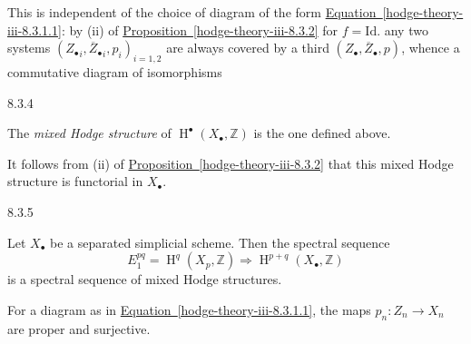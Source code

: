     This is independent of the choice of diagram of the form \hyperref[hodge-theory-iii-8.3.1.1]{Equation~\ref*{hodge-theory-iii-8.3.1.1}}: by (ii) of \hyperref[hodge-theory-iii-8.3.2]{Proposition~\ref*{hodge-theory-iii-8.3.2}} for \(f=\mathrm {Id}\). any two systems \(({Z_\bullet }_i,{\overline {Z}_\bullet }_i,p_i)_{i=1,2}\) are always covered by a third \((Z_\bullet ,\overline {Z}_\bullet ,p)\), whence a commutative diagram of isomorphisms

    
  \begin{definition}{8.3.4}\label{hodge-theory-iii-8.3.4}\skipsinglepar\par{}The \emph{mixed Hodge structure} of \(\operatorname {H}^\bullet (X_\bullet ,\mathbb {Z})\) is the one defined above.\end{definition}\par{}It follows from (ii) of \hyperref[hodge-theory-iii-8.3.2]{Proposition~\ref*{hodge-theory-iii-8.3.2}} that this mixed Hodge structure is functorial in \(X_\bullet \).\begin{proposition}{8.3.5}\label{hodge-theory-iii-8.3.5}\skipsinglepar\par{}Let \(X_\bullet \) be a separated simplicial scheme.
    Then the spectral sequence
    \[       E_1^{pq}       = \operatorname {H}^q(X_p,\mathbb {Z})       \Rightarrow  \operatorname {H}^{p+q}(X_\bullet ,\mathbb {Z})     \]
    is a spectral sequence of mixed Hodge structures.\end{proposition}\par{}For a diagram as in \hyperref[hodge-theory-iii-8.3.1.1]{Equation~\ref*{hodge-theory-iii-8.3.1.1}}, the maps \(p_n\colon  Z_n\to  X_n\) are proper and surjective.
